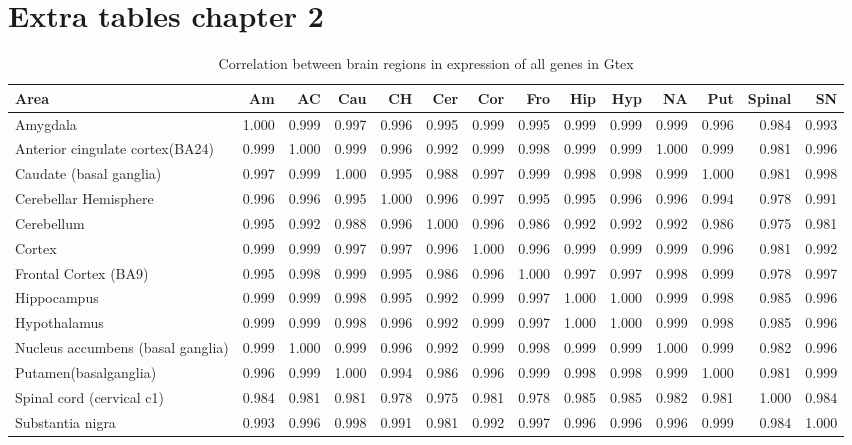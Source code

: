 \chapter{Extra tables chapter 2}

\begin{table}[ht]
\centering
\begin{adjustbox}{width=\textwidth}
\begin{tabular}{>{\small}lrrrrrrrrrrrrr}
  \hline
Area & Am & AC & Cau & CH & Cer & Cor & Fro & Hip & Hyp & NA & Put & Spinal & SN \\ 
  \hline
Amygdala & 1.000 & 0.999 & 0.997 & 0.996 & 0.995 & 0.999 & 0.995 & 0.999 & 0.999 & 0.999 & 0.996 & 0.984 & 0.993 \\ 
  Anterior cingulate cortex(BA24) & 0.999 & 1.000 & 0.999 & 0.996 & 0.992 & 0.999 & 0.998 & 0.999 & 0.999 & 1.000 & 0.999 & 0.981 & 0.996 \\ 
  Caudate (basal ganglia) & 0.997 & 0.999 & 1.000 & 0.995 & 0.988 & 0.997 & 0.999 & 0.998 & 0.998 & 0.999 & 1.000 & 0.981 & 0.998 \\ 
  Cerebellar Hemisphere & 0.996 & 0.996 & 0.995 & 1.000 & 0.996 & 0.997 & 0.995 & 0.995 & 0.996 & 0.996 & 0.994 & 0.978 & 0.991 \\ 
  Cerebellum & 0.995 & 0.992 & 0.988 & 0.996 & 1.000 & 0.996 & 0.986 & 0.992 & 0.992 & 0.992 & 0.986 & 0.975 & 0.981 \\ 
  Cortex & 0.999 & 0.999 & 0.997 & 0.997 & 0.996 & 1.000 & 0.996 & 0.999 & 0.999 & 0.999 & 0.996 & 0.981 & 0.992 \\ 
  Frontal Cortex (BA9) & 0.995 & 0.998 & 0.999 & 0.995 & 0.986 & 0.996 & 1.000 & 0.997 & 0.997 & 0.998 & 0.999 & 0.978 & 0.997 \\ 
  Hippocampus & 0.999 & 0.999 & 0.998 & 0.995 & 0.992 & 0.999 & 0.997 & 1.000 & 1.000 & 0.999 & 0.998 & 0.985 & 0.996 \\ 
  Hypothalamus & 0.999 & 0.999 & 0.998 & 0.996 & 0.992 & 0.999 & 0.997 & 1.000 & 1.000 & 0.999 & 0.998 & 0.985 & 0.996 \\ 
  Nucleus accumbens (basal ganglia) & 0.999 & 1.000 & 0.999 & 0.996 & 0.992 & 0.999 & 0.998 & 0.999 & 0.999 & 1.000 & 0.999 & 0.982 & 0.996 \\ 
  Putamen(basalganglia) & 0.996 & 0.999 & 1.000 & 0.994 & 0.986 & 0.996 & 0.999 & 0.998 & 0.998 & 0.999 & 1.000 & 0.981 & 0.999 \\ 
  Spinal cord (cervical c1) & 0.984 & 0.981 & 0.981 & 0.978 & 0.975 & 0.981 & 0.978 & 0.985 & 0.985 & 0.982 & 0.981 & 1.000 & 0.984 \\ 
  Substantia nigra & 0.993 & 0.996 & 0.998 & 0.991 & 0.981 & 0.992 & 0.997 & 0.996 & 0.996 & 0.996 & 0.999 & 0.984 & 1.000 \\ 
   \hline
\end{tabular}
\end{adjustbox}
\caption{Correlation between brain regions in expression of all genes in Gtex}
\label{Correlation between brain regions in expression of all genes in Gtex}
\end{table}


